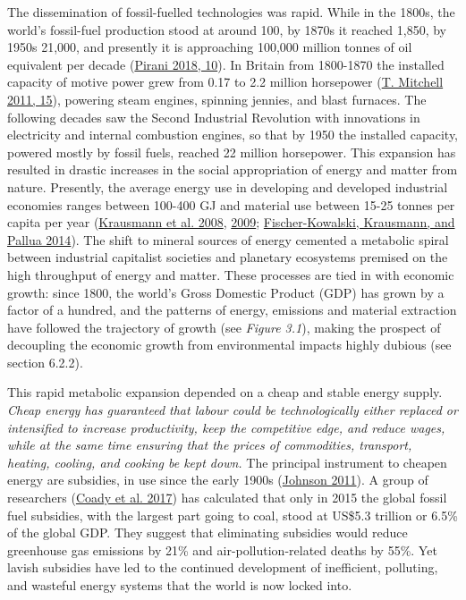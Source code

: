 \documentclass[a4paper, nobind]{templates/ociamthesis}
\begin{document}
The dissemination of fossil-fuelled technologies was rapid. While in the 1800s, the world's fossil-fuel production stood at around 100, by 1870s it reached 1,850, by 1950s 21,000, and presently it is approaching 100,000 million tonnes of oil equivalent per decade (\protect\hyperlink{ref-pirani_burning_2018}{Pirani 2018, 10}). In Britain from 1800-1870 the installed capacity of motive power grew from 0.17 to 2.2 million horsepower (\protect\hyperlink{ref-mitchell_carbon_2011}{T. Mitchell 2011, 15}), powering steam engines, spinning jennies, and blast furnaces. The following decades saw the Second Industrial Revolution with innovations in electricity and internal combustion engines, so that by 1950 the installed capacity, powered mostly by fossil fuels, reached 22 million horsepower. This expansion has resulted in drastic increases in the social appropriation of energy and matter from nature. Presently, the average energy use in developing and developed industrial economies ranges between 100-400 GJ and material use between 15-25 tonnes per capita per year (\protect\hyperlink{ref-krausmann_global_2008}{Krausmann et al. 2008}, \protect\hyperlink{ref-krausmann_growth_2009}{2009}; \protect\hyperlink{ref-fischer-kowalski_sociometabolic_2014}{Fischer-Kowalski, Krausmann, and Pallua 2014}). The shift to mineral sources of energy cemented a metabolic spiral between industrial capitalist societies and planetary ecosystems premised on the high throughput of energy and matter. These processes are tied in with economic growth: since 1800, the world's Gross Domestic Product (GDP) has grown by a factor of a hundred, and the patterns of energy, emissions and material extraction have followed the trajectory of growth (see \emph{Figure 3.1}), making the prospect of decoupling the economic growth from environmental impacts highly dubious (see section 6.2.2).

This rapid metabolic expansion depended on a cheap and stable energy supply. \emph{Cheap energy has guaranteed that labour could be technologically either replaced or intensified to increase productivity, keep the competitive edge, and reduce wages, while at the same time ensuring that the prices of commodities, transport, heating, cooling, and cooking be kept down.} The principal instrument to cheapen energy are subsidies, in use since the early 1900s (\protect\hyperlink{ref-johnson_long_2011}{Johnson 2011}). A group of researchers (\protect\hyperlink{ref-coady_how_2017}{Coady et al. 2017}) has calculated that only in 2015 the global fossil fuel subsidies, with the largest part going to coal, stood at US\$5.3 trillion or 6.5\% of the global GDP. They suggest that eliminating subsidies would reduce greenhouse gas emissions by 21\% and air-pollution-related deaths by 55\%. Yet lavish subsidies have led to the continued development of inefficient, polluting, and wasteful energy systems that the world is now locked into.
\end{document}
